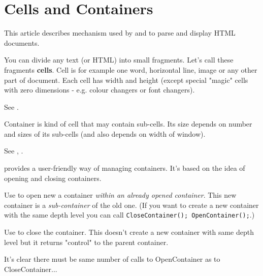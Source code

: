 \section{Cells and Containers}\label{cells}

This article describes mechanism used by 
 and 
 to parse and display HTML documents.


You can divide any text (or HTML) into small fragments. Let's call these
fragments {\bf cells}. Cell is for example one word, horizontal line, image
or any other part of document. Each cell has width and height (except special
"magic" cells with zero dimensions - e.g. colour changers or font changers).

See .


Container is kind of cell that may contain sub-cells. Its size depends
on number and sizes of its sub-cells (and also depends on width of window). 

See , 
.

\begin{comment}
This image shows you cells and containers:

\helponly{\image{}{contbox.bmp}}
\end{comment}

 provides a user-friendly way
of managing containers. It's based on the idea of opening and closing containers.

Use  to open new
a container {\it within an already opened container}. This new container is a 
{\it sub-container} of the old one. (If you want to create a new container with
the same depth level you can call {\tt CloseContainer(); OpenContainer();}.)

Use  to close the 
container. This doesn't create a new container with same depth level but
it returns "control" to the parent container.

\begin{comment}
See explanation:

\helponly{\image{}{cont.bmp}}
\end{comment}
It's clear there must be same number of calls to 
OpenContainer as to CloseContainer...

